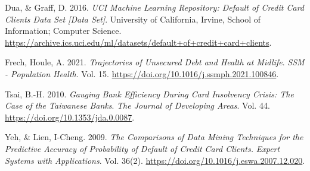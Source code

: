 \documentclass[
]{article}
\newlength{\cslhangindent}
\newlength{\cslentryspacingunit} %
\newenvironment{CSLReferences}[2] %
 {%
  \setlength{\parindent}{0pt}
  \ifodd #1
  \let\oldpar\par
  \def\par{\hangindent=\cslhangindent\oldpar}
  \fi
  \setlength{\parskip}{#2\cslentryspacingunit}
 }%
 {}
\begin{document}
\hypertarget{refs}{}
\begin{CSLReferences}{1}{0}
\leavevmode{}%
Dua, \& Graff, D. 2016. \emph{UCI Machine Learning Repository: Default
of Credit Card Clients Data Set {[}Data Set{]}}. University of
California, Irvine, School of Information; Computer Science.
\url{https://archive.ics.uci.edu/ml/datasets/default+of+credit+card+clients}.

\leavevmode{}%
Frech, Houle, A. 2021. \emph{Trajectories of Unsecured Debt and Health
at Midlife}. \emph{SSM - Population Health}. Vol. 15.
\url{https://doi.org/10.1016/j.ssmph.2021.100846}.

\leavevmode{}%
Tsai, B.-H. 2010. \emph{Gauging Bank Efficiency During Card Insolvency
Crisis: The Case of the Taiwanese Banks}. \emph{The Journal of
Developing Areas}. Vol. 44. \url{https://doi.org/10.1353/jda.0.0087}.

\leavevmode{}%
Yeh, \& Lien, I-Cheng. 2009. \emph{The Comparisons of Data Mining
Techniques for the Predictive Accuracy of Probability of Default of
Credit Card Clients.} \emph{Expert Systems with Applications}. Vol.
36(2). \url{https://doi.org/10.1016/j.eswa.2007.12.020}.

\end{CSLReferences}
\end{document}
